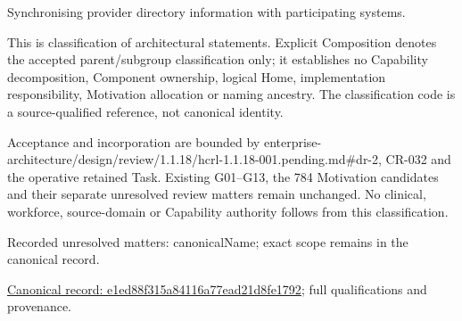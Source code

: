 Synchronising provider directory information with participating systems.



This is classification of architectural statements. Explicit Composition denotes the accepted parent/subgroup classification only; it establishes no Capability decomposition, Component ownership, logical Home, implementation responsibility, Motivation allocation or naming ancestry. The classification code is a source-qualified reference, not canonical identity.



Acceptance and incorporation are bounded by enterprise-architecture/design/review/1.1.18/hcrl-1.1.18-001.pending.md\#dr-2, CR-032 and the operative retained Task. Existing G01–G13, the 784 Motivation candidates and their separate unresolved review matters remain unchanged. No clinical, workforce, source-domain or Capability authority follows from this classification.


{\small Recorded unresolved matters: canonicalName; exact scope remains in the canonical record.}\par
{\footnotesize \href{../../../../continuum/grouping/e1ed88f315a84116a77ead21d8fe1792.md}{Canonical record: e1ed88f315a84116a77ead21d8fe1792}; full qualifications and provenance.}\par
